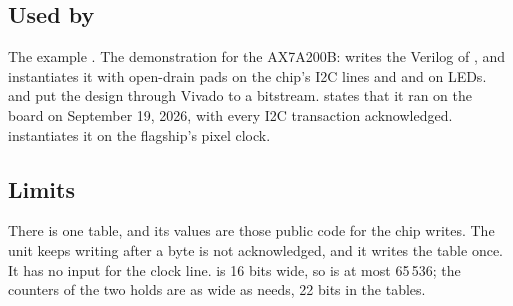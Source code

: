 \subsection*{Used by}

The example . The demonstration for the AX7A200B:
 writes the Verilog of , and
 instantiates it with open-drain pads on
the chip's I2C lines and  and  on LEDs.
 and  put the design
through Vivado to a bitstream.  states that it ran
on the board on September 19, 2026, with every I2C transaction
acknowledged.  instantiates it on the
flagship's pixel clock.

\subsection*{Limits}

There is one table, and its values are those public code for the chip
writes. The unit keeps writing after a byte is not acknowledged, and it
writes the table once.
It has no input for the clock line.  is 16 bits wide, so
 is at most 65\,536; the counters of the two holds are as
wide as  needs, 22 bits in the tables.
